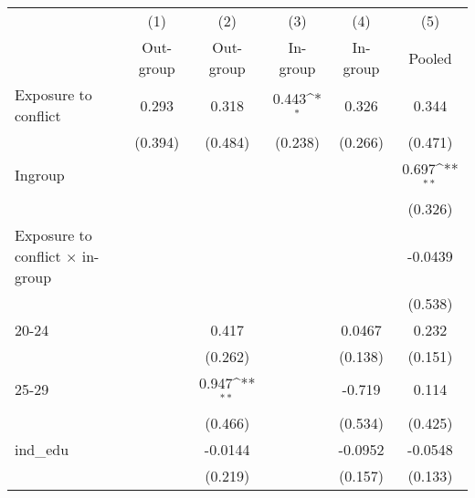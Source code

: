 {
\def\sym#1{\ifmmode^{#1}\else\(^{#1}\)\fi}
\begin{tabular}{l*{5}{c}}
\hline\hline
                    &\multicolumn{1}{c}{(1)}&\multicolumn{1}{c}{(2)}&\multicolumn{1}{c}{(3)}&\multicolumn{1}{c}{(4)}&\multicolumn{1}{c}{(5)}\\
                    &\multicolumn{1}{c}{Out-group}&\multicolumn{1}{c}{Out-group}&\multicolumn{1}{c}{In-group}&\multicolumn{1}{c}{In-group}&\multicolumn{1}{c}{Pooled}\\
\hline
Exposure to conflict&       0.293         &       0.318         &       0.443\sym{*}  &       0.326         &       0.344         \\
                    &     (0.394)         &     (0.484)         &     (0.238)         &     (0.266)         &     (0.471)         \\
[1em]
Ingroup             &                     &                     &                     &                     &       0.697\sym{**} \\
                    &                     &                     &                     &                     &     (0.326)         \\
[1em]
Exposure to conflict × in-group &                     &                     &                     &                     &     -0.0439         \\
                    &                     &                     &                     &                     &     (0.538)         \\
[1em]
20-24               &                     &       0.417         &                     &      0.0467         &       0.232         \\
                    &                     &     (0.262)         &                     &     (0.138)         &     (0.151)         \\
[1em]
25-29               &                     &       0.947\sym{**} &                     &      -0.719         &       0.114         \\
                    &                     &     (0.466)         &                     &     (0.534)         &     (0.425)         \\
[1em]
ind\_edu             &                     &     -0.0144         &                     &     -0.0952         &     -0.0548         \\
                    &                     &     (0.219)         &                     &     (0.157)         &     (0.133)         \\

\end{tabular}}
